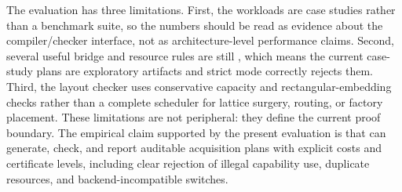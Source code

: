 The evaluation has three limitations.
First, the workloads are case studies rather than a benchmark suite, so the numbers should be read as evidence about the compiler/checker interface, not as architecture-level performance claims.
Second, several useful bridge and resource rules are still \Assumed{}, which means the current case-study plans are exploratory artifacts and strict mode correctly rejects them.
Third, the layout checker uses conservative capacity and rectangular-embedding checks rather than a complete scheduler for lattice surgery, routing, or factory placement.
These limitations are not peripheral: they define the current proof boundary.
The empirical claim supported by the present evaluation is that \system can generate, check, and report auditable acquisition plans with explicit costs and certificate levels, including clear rejection of illegal capability use, duplicate resources, and backend-incompatible switches.
